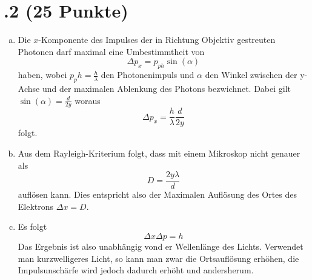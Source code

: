 \section*{\nr.2 \tittwo (25 Punkte)}
\begin{enumerate}[(a)]
\item Die $x$-Komponente des Impulses der in Richtung Objektiv gestreuten Photonen darf maximal eine Umbestimmtheit von
\begin{equation}
  \Delta p_x= p_{ph}\sin(\alpha)
\end{equation}
haben, wobei $p_ph=\frac{h}{\lambda}$ den Photonenimpuls und $\alpha$ den Winkel zwischen der y-Achse und der maximalen Ablenkung des Photons bezwichnet. Dabei gilt $\sin(\alpha)=\frac{d}{2y}$ woraus
\begin{equation}
  \Delta p_x=\frac{h}{\lambda}\frac{d}{2y}
\end{equation}
folgt.
\item Aus dem Rayleigh-Kriterium folgt, dass mit einem Mikroskop nicht genauer als 
\begin{equation}
  D=\frac{2y\lambda}{d}
\end{equation}
auflösen kann. Dies entspricht also der Maximalen Auflösung des Ortes des Elektrons $\Delta x=D$.
\item Es folgt
\begin{equation}
  \Delta x \Delta p = h
\end{equation}
Das Ergebnis ist also unabhängig vond er Wellenlänge des Lichts. Verwendet man kurzwelligeres Licht, so kann man zwar die Ortsauflösung erhöhen, die Impulsunschärfe wird jedoch dadurch erhöht und andersherum. 
\end{enumerate}
